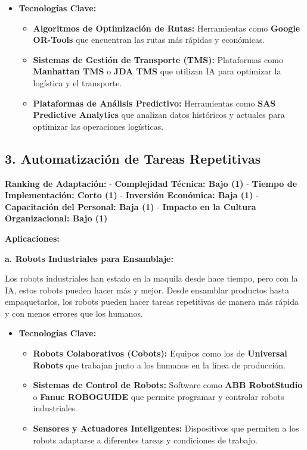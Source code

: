 \documentclass[
  letterpaper,
]{book}
\providecommand{\tightlist}{%
  \setlength{\itemsep}{0pt}\setlength{\parskip}{0pt}}\usepackage{longtable,booktabs,array}
\begin{document}
\begin{itemize}
\tightlist
\item
  \textbf{Tecnologías Clave:}

  \begin{itemize}
  \tightlist
  \item
    \textbf{Algoritmos de Optimización de Rutas:} Herramientas como
    \textbf{Google OR-Tools} que encuentran las rutas más rápidas y
    económicas.
  \item
    \textbf{Sistemas de Gestión de Transporte (TMS):} Plataformas como
    \textbf{Manhattan TMS} o \textbf{JDA TMS} que utilizan IA para
    optimizar la logística y el transporte.
  \item
    \textbf{Plataformas de Análisis Predictivo:} Herramientas como
    \textbf{SAS Predictive Analytics} que analizan datos históricos y
    actuales para optimizar las operaciones logísticas.
  \end{itemize}
\end{itemize}

\subsection{\texorpdfstring{3. \textbf{Automatización de Tareas
Repetitivas}}{3. Automatización de Tareas Repetitivas}}\label{automatizaciuxf3n-de-tareas-repetitivas}

\textbf{Ranking de Adaptación:} - \textbf{Complejidad Técnica: Bajo (1)}
- \textbf{Tiempo de Implementación: Corto (1)} - \textbf{Inversión
Económica: Baja (1)} - \textbf{Capacitación del Personal: Baja (1)} -
\textbf{Impacto en la Cultura Organizacional: Bajo (1)}

\textbf{Aplicaciones:}

\textbf{a. Robots Industriales para Ensamblaje:}

Los robots industriales han estado en la maquila desde hace tiempo, pero
con la IA, estos robots pueden hacer más y mejor. Desde ensamblar
productos hasta empaquetarlos, los robots pueden hacer tareas
repetitivas de manera más rápida y con menos errores que los humanos.

\begin{itemize}
\tightlist
\item
  \textbf{Tecnologías Clave:}

  \begin{itemize}
  \tightlist
  \item
    \textbf{Robots Colaborativos (Cobots):} Equipos como los de
    \textbf{Universal Robots} que trabajan junto a los humanos en la
    línea de producción.
  \item
    \textbf{Sistemas de Control de Robots:} Software como \textbf{ABB
    RobotStudio} o \textbf{Fanuc ROBOGUIDE} que permite programar y
    controlar robots industriales.
  \item
    \textbf{Sensores y Actuadores Inteligentes:} Dispositivos que
    permiten a los robots adaptarse a diferentes tareas y condiciones de
    trabajo.
  \end{itemize}
\end{itemize}
\end{document}

